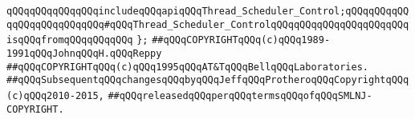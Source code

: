 \verb|qQQqqQQqqQQqqQQqincludeqQQqapiqQQqThread_Scheduler_Control;qQQqqQQqqQQqqQQqqQQqqQQqqQQq#qQQqThread_Scheduler_ControlqQQqqQQqqQQqqQQqqQQqqQQqisqQQqfromqQQqqQQqqQQq|\newline
\verb|};|\newline
\newline
\newline
\newline
\verb|##qQQqCOPYRIGHTqQQq(c)qQQq1989-1991qQQqJohnqQQqH.qQQqReppy|\newline
\verb|##qQQqCOPYRIGHTqQQq(c)qQQq1995qQQqAT&TqQQqBellqQQqLaboratories.|\newline
\verb|##qQQqSubsequentqQQqchangesqQQqbyqQQqJeffqQQqProtheroqQQqCopyrightqQQq(c)qQQq2010-2015,|\newline
\verb|##qQQqreleasedqQQqperqQQqtermsqQQqofqQQqSMLNJ-COPYRIGHT.|\newline

